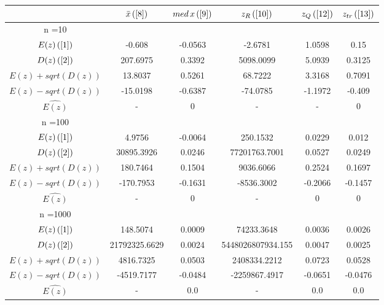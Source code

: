 \begin{tabular}{|c|c|c|c|c|c|}
\hline
 & $\bar{x} \, (\ref{8})$ & $med \, x \, (\ref{9})$ & $z_R \, (\ref{10})$ & $z_Q \, (\ref{12})$ & $z_{tr} \, (\ref{13})$ \\
\hline
n =10 &  &  &  &  & \\
\hline
$E(z) \, (\ref{1})$ & -0.608 & -0.0563 & -2.6781 & 1.0598 & 0.15\\
\hline
$D(z) \, (\ref{2})$ & 207.6975 & 0.3392 & 5098.0099 & 5.0939 & 0.3125\\
\hline
$E(z)+sqrt(D(z))$ & 13.8037 & 0.5261 & 68.7222 & 3.3168 & 0.7091\\
\hline
$E(z)-sqrt(D(z))$ & -15.0198 & -0.6387 & -74.0785 & -1.1972 & -0.409\\
\hline
$\hat{E(z)}$ & - & 0 & - & - & 0\\
\hline
n =100 &  &  &  &  & \\
\hline
$E(z) \, (\ref{1})$ & 4.9756 & -0.0064 & 250.1532 & 0.0229 & 0.012\\
\hline
$D(z) \, (\ref{2})$ & 30895.3926 & 0.0246 & 77201763.7001 & 0.0527 & 0.0249\\
\hline
$E(z)+sqrt(D(z))$ & 180.7464 & 0.1504 & 9036.6066 & 0.2524 & 0.1697\\
\hline
$E(z)-sqrt(D(z))$ & -170.7953 & -0.1631 & -8536.3002 & -0.2066 & -0.1457\\
\hline
$\hat{E(z)}$ & - & 0 & - & 0 & 0\\
\hline
n =1000 &  &  &  &  & \\
\hline
$E(z) \, (\ref{1})$ & 148.5074 & 0.0009 & 74233.3648 & 0.0036 & 0.0026\\
\hline
$D(z) \, (\ref{2})$ & 21792325.6629 & 0.0024 & 5448026807934.155 & 0.0047 & 0.0025\\
\hline
$E(z)+sqrt(D(z))$ & 4816.7325 & 0.0503 & 2408334.2212 & 0.0723 & 0.0528\\
\hline
$E(z)-sqrt(D(z))$ & -4519.7177 & -0.0484 & -2259867.4917 & -0.0651 & -0.0476\\
\hline
$\hat{E(z)}$ & - & 0.0 & - & 0.0 & 0.0\\
\hline
\end{tabular}